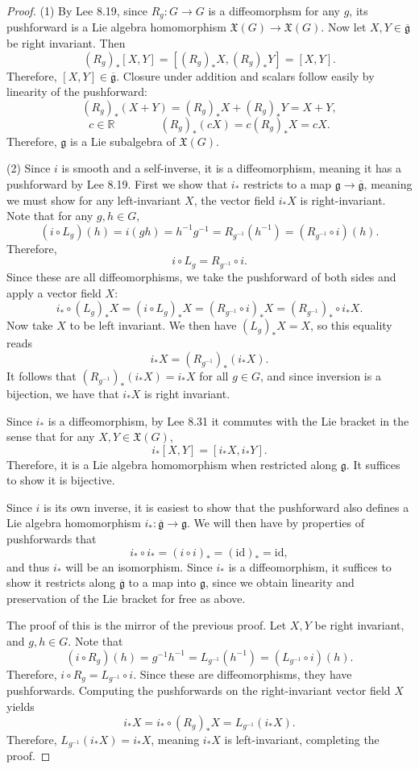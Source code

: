 \documentclass[11pt, letterpaper]{article}
\begin{document}
\begin{proof}
	(1) By Lee 8.19, since $R_g : G \to G$ is a diffeomorphsm for any $g$, its pushforward is a Lie algebra homomorphism $\mathfrak{X} (G)\to \mathfrak{X} (G)$. Now let $X,Y \in \overline{\mathfrak{g} } $ be right invariant. Then
	\[
		(R_g)_*[X,Y]=[(R_g)_*X,(R_g)_*Y]=[X,Y]
	.\]
	Therefore, $[X,Y]\in \overline{\mathfrak{g} } $. Closure under addition and scalars follow easily by linearity of the pushforward:
	\[
		(R_g)_*(X+Y)=(R_g)_*X+(R_g)_*Y=X+Y,
	\]
	\[
		c\in\mathbb{R} \qquad \qquad (R_g)_*(cX)=c(R_g)_*X=cX
	.\]
	Therefore, $\mathfrak{g} $ is a Lie subalgebra of $\mathfrak{X} (G)$.

	(2) Since $i$ is smooth and a self-inverse, it is a diffeomorphism, meaning it has a pushforward by Lee 8.19. First we show that $i_*$ restricts to a map $\mathfrak{g} \to \overline{\mathfrak{g} } $, meaning we must show for any left-invariant $X$, the vector field $i_*X$ is right-invariant. Note that for any $g,h\in G$,
	\[
		(i\circ L_g)(h)=i(gh)=h^{-1} g^{-1} =R_{g^{-1} } (h^{-1} )=(R_{g^{-1} } \circ i)(h)
	.\]
	Therefore,
	\[
		i\circ L_g=R_{g^{-1} } \circ i
	.\]
	Since these are all diffeomorphisms, we take the pushforward of both sides and apply a vector field $X$:
	\[
		i_*\circ (L_g)_*X=(i\circ L_g)_*X=(R_{g^{-1} } \circ i)_*X=(R_{g^{-1} })_* \circ i_*X
	.\]
	Now take $X$ to be left invariant. We then have $(L_g)_*X=X$, so this equality reads
	\[
		i_*X=(R_{g^{-1} })_* (i_*X)
	.\]
	It follows that $(R_{g^{-1} } )_*(i_*X)=i_*X$ for all $g\in G$, and since inversion is a bijection, we have that $i_*X$ is right invariant.

	Since $i_*$ is a diffeomorphism, by Lee 8.31 it commutes with the Lie bracket in the sense that for any $X,Y\in \mathfrak{X} (G)$,
	\[
		i_*[X,Y]=[i_*X,i_*Y]
	.\]
	Therefore, it is a Lie algebra homomorphism when restricted along $\mathfrak{g} $. It suffices to show it is bijective.

	Since $i$ is its own inverse, it is easiest to show that the pushforward also defines a Lie algebra homomorphism $i_* : \overline{\mathfrak{g} }  \to \mathfrak{g} $. We will then have by properties of pushforwards that
	\[
		i_* \circ i_*=(i\circ i)_*=(\mathrm{id} )_*=\mathrm{id} 
	,\]
	and thus $i_*$ will be an isomorphism. Since $i_*$ is a diffeomorphism, it suffices to show it restricts along $\overline{\mathfrak{g} } $ to a map into $\mathfrak{g} $, since we obtain linearity and preservation of the Lie bracket for free as above.

	The proof of this is the mirror of the previous proof. Let $X,Y$ be right invariant, and $g,h\in G$. Note that
	\[
		(i\circ R_g)(h)=g^{-1} h^{-1} =L_{g^{-1} } (h^{-1} )=(L_{g^{-1} } \circ i)(h)
	.\]
	Therefore, $i\circ R_g=L_{g^{-1} } \circ i$. Since these are diffeomorphisms, they have pushforwards. Computing the pushforwards on the right-invariant vector field $X$ yields
	\[
		i_*X = i_*\circ (R_g)_*X = L_{g^{-1} } (i_*X)
	.\]
	Therefore, $L_{g^{-1} } (i_*X)=i_*X$, meaning $i_*X$ is left-invariant, completing the proof.
\end{proof}
\end{document}
